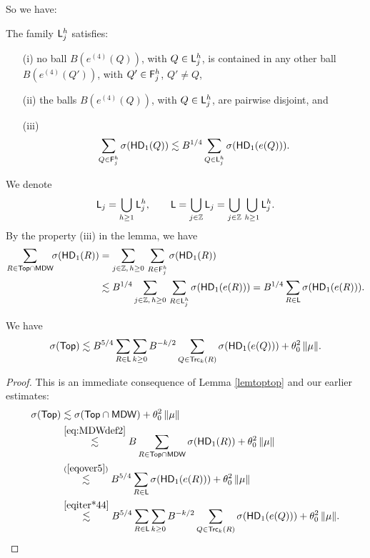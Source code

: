 So we have:

\begin{lemma}\label{lemljh}
The family ${\mathsf{L}}_j^h$ satisfies:
\begin{itemize}
\item[(i)] no ball $B(e^{(4)}(Q))$, with $Q\in {\mathsf{L}}_j^h$, is contained in any other ball  
$B(e^{(4)}(Q'))$, with $Q'\in {\mathsf{F}}_j^h$, $Q'\neq Q$,
\item[(ii)] the balls $B(e^{(4)}(Q))$, with $Q\in {\mathsf{L}}_j^h$, are pairwise disjoint, 
and
\item[(iii)] 
 $$\sum_{Q\in {\mathsf{F}}_j^h} \sigma({\mathsf{HD}}_1(Q)) \lesssim B^{1/4} 
\sum_{Q\in {\mathsf{L}}_j^h}\sigma({\mathsf{HD}}_1(e(Q))).$$
\end{itemize}
\end{lemma}

\vv
We denote 
$${\mathsf{L}}_j= \bigcup_{h\geq 1}{\mathsf{L}}_j^h,\qquad {\mathsf{L}}= \bigcup_{j\in{\mathbb Z}}{\mathsf{L}}_j =
\bigcup_{j\in{\mathbb Z}}\,\bigcup_{h\geq 1}{\mathsf{L}}_j^h.$$
By the property (iii) in the lemma, we have
\begin{align}\label{eqover5}
\sum_{R\in {\mathsf {Top}}\cap {\mathsf{MDW}}}\!\!\sigma({\mathsf{HD}}_1(R)) & = \sum_{j\in{\mathbb Z}, \,h\geq0}\,
\sum_{R\in{\mathsf{F}}_j^h} \sigma({\mathsf{HD}}_1(R)) \\ 
& \lesssim B^{1/4} \sum_{j\in{\mathbb Z}, \,h\geq0}\,\sum_{R\in {\mathsf{L}}_j^h}\sigma({\mathsf{HD}}_1(e(R))) = B^{1/4}\sum_{R\in {\mathsf{L}}}\sigma({\mathsf{HD}}_1(e(R))).\nonumber
\end{align}

\vv

\begin{lemma}\label{lemsuper**9}
We have
$$\sigma({\mathsf {Top}}) \lesssim B^{5/4} \sum_{R\in {\mathsf{L}}} \sum_{k\geq0} B^{-k/2}\sum_{Q\in{\mathsf{Trc}}_k(R)}\sigma({\mathsf{HD}}_1(e(Q))) + \theta_0^2\,\|\mu\|.$$
\end{lemma}


\begin{proof}
This is an immediate consequence of Lemma \ref{lemtoptop} and our earlier estimates: 
\begin{align*}
\sigma(\ttt)  & \lesssim \sigma(\ttt\cap\MDW)+ \theta_0^2\,\|\mu\|\\
& \overset{\eqref{eq:MDWdef2}}{\lesssim} B\sum_{R\in \ttt\cap\MDW}\sigma(\HD_1(R)) + \theta_0^2\,\|\mu\|\\
& \overset{\rf{eqover5}}{\lesssim} B^{5/4}\sum_{R\in \sL}\sigma(\HD_1(e(R))) + \theta_0^2\,\|\mu\|\\
& \overset{\eqref{eqiter*44}}{\lesssim} B^{5/4} \sum_{R\in \sL} \sum_{k\geq0} B^{-k/2}\sum_{Q\in\Trc_k(R)}\sigma(\HD_1(e(Q))) + \theta_0^2\,\|\mu\|.
\end{align*}
\end{proof}

